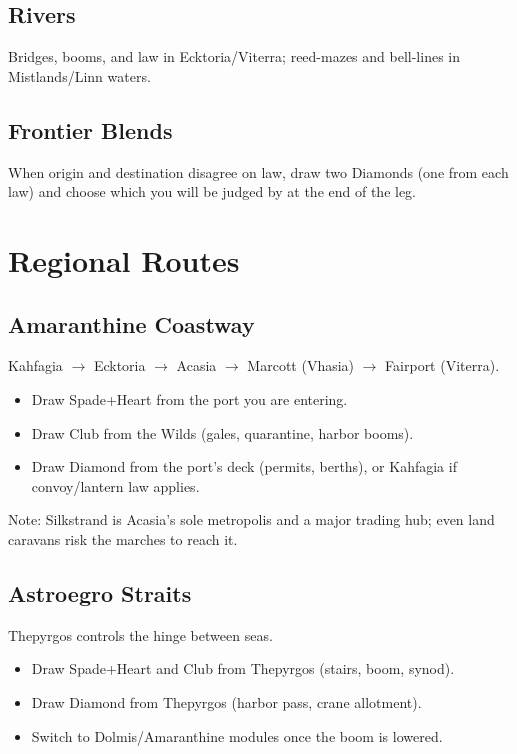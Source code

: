 \documentclass[11pt,letterpaper,twoside]{book}
\begin{document}
\subsection{Rivers}
Bridges, booms, and law in Ecktoria/Viterra; reed-mazes and bell-lines in Mistlands/Linn waters.

\subsection{Frontier Blends}
When origin and destination disagree on law, draw two Diamonds (one from each law) and choose which you will be judged by at the end of the leg.

\section{Regional Routes}

\subsection{Amaranthine Coastway}
Kahfagia $\rightarrow$ Ecktoria $\rightarrow$ Acasia $\rightarrow$ Marcott (Vhasia) $\rightarrow$ Fairport (Viterra).

\begin{itemize}
\item Draw Spade+Heart from the port you are entering.
\item Draw Club from the Wilds (gales, quarantine, harbor booms).
\item Draw Diamond from the port's deck (permits, berths), or Kahfagia if convoy/lantern law applies.
\end{itemize}

Note: Silkstrand is Acasia's sole metropolis and a major trading hub; even land caravans risk the marches to reach it.

\subsection{Astroegro Straits}
Thepyrgos controls the hinge between seas.

\begin{itemize}
\item Draw Spade+Heart and Club from Thepyrgos (stairs, boom, synod).
\item Draw Diamond from Thepyrgos (harbor pass, crane allotment).
\item Switch to Dolmis/Amaranthine modules once the boom is lowered.
\end{itemize}
\end{document}
